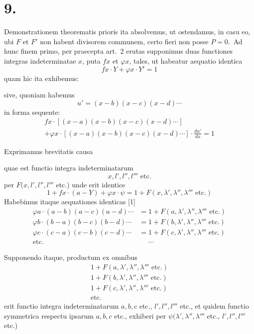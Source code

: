 \documentclass[12pt,a4paper]{article}
\theoremstyle{plain}
\begin{document}
\section*{9.}

Demonstrationem theorematis prioris ita absolvemus, ut ostendamus, in
casu eo, ubi $F$ et $F'$ non habent divisorem communem, certo fieri non posse
$P = 0$.\ Ad hunc finem primo, per praecepta art.\ 2 erutas supponimus duas
functiones integras indeterminatae $x$, puta $fx$ et $\varphi x$,
tales, ut habeatur aequatio identica
\[
fx \cdot Y + \varphi x \cdot Y' = 1
\]
quam hic ita exhibemus:

sive, quoniam habemus
\[
u' = (x-b)(x-c)(x-d) \cdots
\]
in forma sequente:
\begin{multline*}
fx \cdot [(x-a)(x-b)(x-c)(x-d) \cdots] \\
+ \varphi x \cdot [(x-a)(x-b)(x-c)(x-d) \cdots] \cdot \frac{du'}{dx} = 1
\end{multline*}

Exprimamus brevitatis causa

quae est functio integra indeterminatarum
\[
x, l', l'', l''' \text{ etc.}
\]
per $F(x, l', l'', l'''$ etc.)
unde erit identice
\[
1 + fx \cdot (a-Y) + \varphi x \cdot \psi = 1 + F(x, \lambda', \lambda'', \lambda''' \text{ etc.})
\]
Habebimus itaque aequationes identicas [1]
\begin{align*}
\varphi a \cdot (a-b)(a-c)(a-d) \cdots &= 1 + F(a, \lambda', \lambda'', \lambda''' \text{ etc.}) \\
\varphi b \cdot (b-a)(b-c)(b-d) \cdots &= 1 + F(b, \lambda', \lambda'', \lambda''' \text{ etc.}) \\
\varphi c \cdot (c-a)(c-b)(c-d) \cdots &= 1 + F(c, \lambda', \lambda'', \lambda''' \text{ etc.}) \\
\text{etc.} &\phantom{=} \cdots
\end{align*}

Supponendo itaque, productum ex omnibus
\begin{gather*}
1 + F(a, \lambda', \lambda'', \lambda''' \text{ etc.}) \\
1 + F(b, \lambda', \lambda'', \lambda''' \text{ etc.}) \\
1 + F(c, \lambda', \lambda'', \lambda''' \text{ etc.}) \\
\text{etc.}
\end{gather*}
erit functio integra indeterminatarum $a, b, c$ etc., $l', l'', l'''$ etc.,
et quidem functio symmetrica respectu ipsarum $a, b, c$ etc., exhiberi per
$\psi(\lambda', \lambda'', \lambda'''$ etc., $l', l'', l'''$ etc.)
\end{document}
